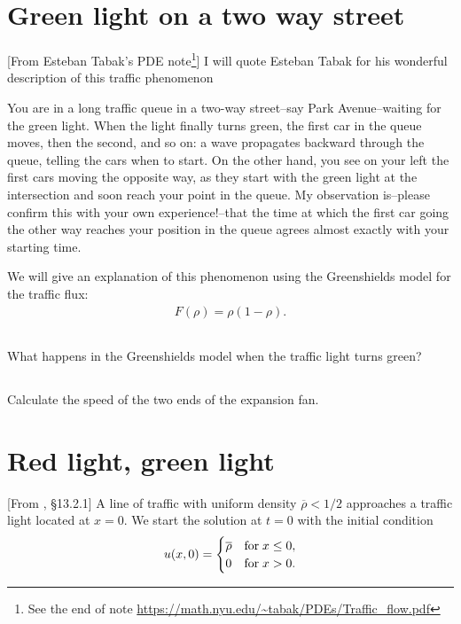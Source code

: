 \documentclass[11pt,letterpaper]{article}
\begin{document}
\section{Green light on a two way street}
[From Esteban Tabak's PDE note\footnote{See the end of note \url{https://math.nyu.edu/~tabak/PDEs/Traffic_flow.pdf}}] I will quote Esteban Tabak for his wonderful description of this traffic phenomenon
\begin{displayquote}
    You are in a long traffic queue in a two-way street--say Park Avenue--waiting for the green light. When the light finally turns green, the first car in the queue moves, then the second, and so on: a wave propagates backward through the queue, telling the cars when to start. On the other hand, you see on your left the first cars moving the opposite way, as they start with the green light at the intersection and soon reach your point in the queue. My observation is--please confirm this with your own experience!--that the time at which the first car going the other way reaches your position in the queue agrees almost exactly with your starting time. 
\end{displayquote}
We will give an explanation of this phenomenon using the Greenshields model for the traffic flux:
\begin{align}
    F(\rho) = \rho(1-\rho).
\end{align}

\subsection{}
What happens in the Greenshields model when the traffic light turns green?

\subsection{}
Calculate the speed of the two ends of the expansion fan.

\section{Red light, green light}
[From \cite{ShearerLevy_15}, \S 13.2.1] A line of traffic with uniform density $\overline{\rho}<1/2$ approaches a traffic light located at $x=0$. We start the solution at $t=0$ with the initial condition
\begin{align}
    u(x,0) = \begin{cases}
        \overline{\rho} & \text{for\;} x\leq 0,\\
        0 & \text{for\;} x>0.
    \end{cases}
\end{align}
\end{document}
